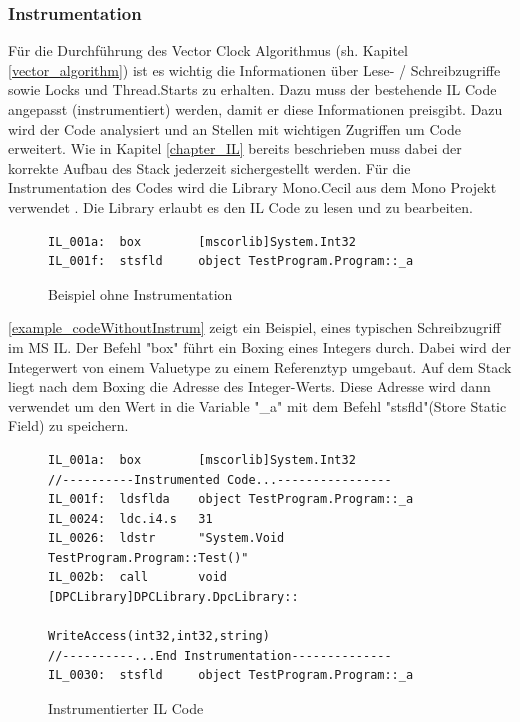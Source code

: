 \documentclass[10pt,a4paper]{article}
\begin{document}
\subsubsection{Instrumentation}
\begin{flushleft}
Für die Durchführung des Vector Clock Algorithmus (sh. Kapitel \ref{vector_algorithm}) ist es wichtig die Informationen über Lese- / Schreibzugriffe sowie Locks und Thread.Starts zu erhalten. Dazu muss der bestehende IL Code angepasst (instrumentiert) werden, damit er diese Informationen preisgibt. Dazu wird der Code analysiert und an Stellen mit wichtigen Zugriffen um Code erweitert. Wie in Kapitel \ref{chapter_IL} bereits beschrieben muss dabei der korrekte Aufbau des Stack jederzeit sichergestellt werden. Für die Instrumentation des Codes wird die Library Mono.Cecil aus dem Mono Projekt verwendet \cite{monocecil}. Die Library erlaubt es den IL Code zu lesen und zu bearbeiten. 
\begin{figure}[H]
\centering
\begin{lstlisting}[language=CIL,backgroundcolor=\color{backcolor}]
IL_001a:  box        [mscorlib]System.Int32
IL_001f:  stsfld     object TestProgram.Program::_a
\end{lstlisting}
\caption{Beispiel ohne Instrumentation}\label{example_codeWithoutInstrum}
\end{figure}
\autoref{example_codeWithoutInstrum} zeigt ein Beispiel, eines typischen Schreibzugriff im MS IL. Der Befehl "box" führt ein Boxing eines Integers durch. Dabei wird der Integerwert von einem Valuetype zu einem Referenztyp umgebaut. Auf dem Stack liegt nach dem Boxing die Adresse des Integer-Werts. Diese Adresse wird dann verwendet um den Wert in die Variable "\_a" mit dem Befehl "stsfld"(Store Static Field) zu speichern.\\
\begin{figure}[H]
\centering
\begin{lstlisting}[language=CIL,backgroundcolor=\color{backcolor}]
IL_001a:  box        [mscorlib]System.Int32
//----------Instrumented Code...----------------
IL_001f:  ldsflda    object TestProgram.Program::_a
IL_0024:  ldc.i4.s   31
IL_0026:  ldstr      "System.Void TestProgram.Program::Test()"
IL_002b:  call       void [DPCLibrary]DPCLibrary.DpcLibrary::
                                 WriteAccess(int32,int32,string)
//----------...End Instrumentation--------------
IL_0030:  stsfld     object TestProgram.Program::_a
\end{lstlisting}
\caption{Instrumentierter IL Code}\label{example_instrumentedCode}

\end{figure}
\end{flushleft}
\end{document}
